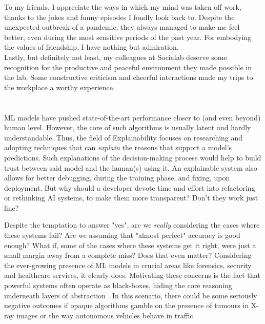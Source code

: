 \documentclass[11pt,twoside]{template/estiloUBI}
\begin{document}
To my friends, I appreciate the ways in which my mind was taken off work, thanks to the jokes and funny episodes I fondly look back to. Despite the unexpected outbreak of a pandemic, they always managed to make me feel better, even during the most sensitive periods of the past year. For embodying the values of friendship, I have nothing but admiration.\\

Lastly, but definitely not least, my colleagues at Socialab deserve some recognition for the productive and peaceful environment they made possible in the lab. Some constructive criticism and cheerful interactions made my trips to the workplace a worthy experience.

\cleardoublepage


\newpage 	
\section*{}
\vspace{0.5cm}

\ac{ML} models have pushed state-of-the-art performance closer to (and even beyond) human level. However, the core of such algorithms is usually latent and hardly understandable. Thus, the field of Explainability focuses on researching and adopting techniques that can \textit{explain} the reasons that support a model's predictions. Such explanations of the decision-making process would help to build trust between said model and the human(s) using it. An explainable system also allows for better debugging, during the training phase, and fixing, upon deployment. But why should a developer devote time and effort into refactoring or rethinking \ac{AI} systems, to make them more transparent? Don't they work just fine? 

Despite the temptation to answer "yes", are we \textit{really} considering the cases where these systems fail? Are we assuming that "almost perfect" accuracy is good enough? What if, some of the cases where these systems get it right, were just a small margin away from a complete miss? Does that even matter? Considering the ever-growing presence of \ac{ML} models in crucial areas like forensics, security and healthcare services, it clearly does. Motivating these concerns is the fact that powerful systems often operate as black-boxes, hiding the core reasoning underneath layers of abstraction \cite{programs_black_box_explanations}. In this scenario, there could be some seriously negative outcomes if opaque algorithms gamble on the presence of tumours in X-ray images or the way autonomous vehicles behave in traffic.\\
\end{document}
